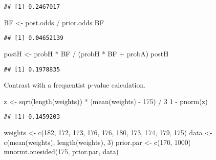 \documentclass[
]{book}
\newenvironment{Shaded}{\begin{snugshade}}{\end{snugshade}}
\newcommand{\DecValTok}[1]{\textcolor[rgb]{0.00,0.00,0.81}{#1}}
\newcommand{\FunctionTok}[1]{\textcolor[rgb]{0.00,0.00,0.00}{#1}}
\newcommand{\NormalTok}[1]{#1}
\newcommand{\OtherTok}[1]{\textcolor[rgb]{0.56,0.35,0.01}{#1}}
\newcommand{\SpecialCharTok}[1]{\textcolor[rgb]{0.00,0.00,0.00}{#1}}
\begin{document}
\begin{verbatim}
## [1] 0.2467017
\end{verbatim}

\begin{Shaded}
\begin{Highlighting}[]
\NormalTok{BF }\OtherTok{\textless{}{-}}\NormalTok{ post.odds }\SpecialCharTok{/}\NormalTok{ prior.odds}
\NormalTok{BF}
\end{Highlighting}
\end{Shaded}

\begin{verbatim}
## [1] 0.04652139
\end{verbatim}

\begin{Shaded}
\begin{Highlighting}[]
\NormalTok{postH  }\OtherTok{\textless{}{-}}\NormalTok{ probH }\SpecialCharTok{*}\NormalTok{ BF }\SpecialCharTok{/}\NormalTok{ (probH }\SpecialCharTok{*}\NormalTok{ BF }\SpecialCharTok{+}\NormalTok{ probA)}
\NormalTok{postH}
\end{Highlighting}
\end{Shaded}

\begin{verbatim}
## [1] 0.1978835
\end{verbatim}

Contrast with a frequentist p-value calculation.

\begin{Shaded}
\begin{Highlighting}[]
\NormalTok{z }\OtherTok{\textless{}{-}} \FunctionTok{sqrt}\NormalTok{(}\FunctionTok{length}\NormalTok{(weights)) }\SpecialCharTok{*} 
\NormalTok{  (}\FunctionTok{mean}\NormalTok{(weights) }\SpecialCharTok{{-}} \DecValTok{175}\NormalTok{) }\SpecialCharTok{/} \DecValTok{3}
\DecValTok{1} \SpecialCharTok{{-}} \FunctionTok{pnorm}\NormalTok{(z)}
\end{Highlighting}
\end{Shaded}

\begin{verbatim}
## [1] 0.1459203
\end{verbatim}

\begin{Shaded}
\begin{Highlighting}[]
\NormalTok{weights }\OtherTok{\textless{}{-}} \FunctionTok{c}\NormalTok{(}\DecValTok{182}\NormalTok{, }\DecValTok{172}\NormalTok{, }\DecValTok{173}\NormalTok{, }\DecValTok{176}\NormalTok{, }\DecValTok{176}\NormalTok{, }\DecValTok{180}\NormalTok{,}
          \DecValTok{173}\NormalTok{, }\DecValTok{174}\NormalTok{, }\DecValTok{179}\NormalTok{, }\DecValTok{175}\NormalTok{)}
\NormalTok{data }\OtherTok{\textless{}{-}} \FunctionTok{c}\NormalTok{(}\FunctionTok{mean}\NormalTok{(weights), }\FunctionTok{length}\NormalTok{(weights), }\DecValTok{3}\NormalTok{)}
\NormalTok{prior.par }\OtherTok{\textless{}{-}} \FunctionTok{c}\NormalTok{(}\DecValTok{170}\NormalTok{, }\DecValTok{1000}\NormalTok{)}
\FunctionTok{mnormt.onesided}\NormalTok{(}\DecValTok{175}\NormalTok{, prior.par, data)}
\end{Highlighting}
\end{Shaded}
\end{document}
